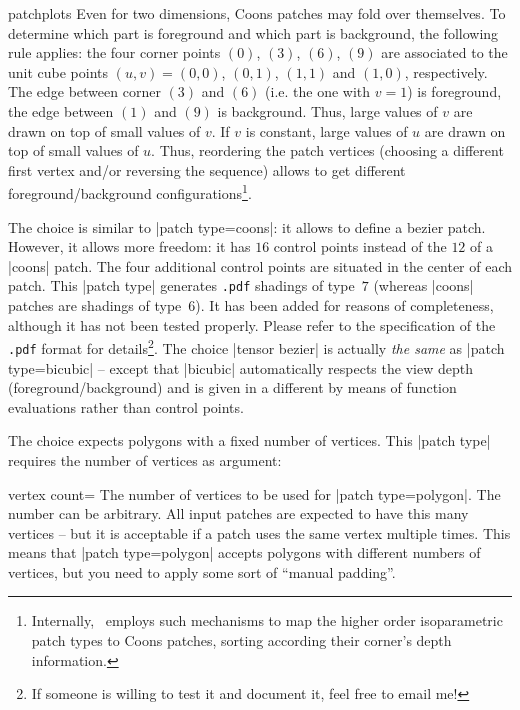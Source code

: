{\begin{pgfplotslibrary}{patchplots}
	Even for two dimensions, Coons patches may fold over themselves. To determine which part is foreground and which part is background, the following rule applies: the four corner points $(0)$, $(3)$, $(6)$, $(9)$ are associated to the unit cube points $(u,v) = (0,0)$, $(0,1)$, $(1,1)$ and $(1,0)$, respectively. The edge between corner $(3)$ and $(6)$ (i.e. the one with $v=1$) is foreground, the edge between $(1)$ and $(9)$ is background. Thus, large values of $v$ are drawn on top of small values of $v$. If $v$ is constant, large values of $u$ are drawn on top of small values of $u$. Thus, reordering the patch vertices (choosing a different first vertex and/or reversing the sequence) allows to get different foreground/background configurations\footnote{Internally, \PGFPlots\ employs such mechanisms to map the higher order isoparametric patch types to Coons patches, sorting according their corner's depth information.}.

	The choice  is similar to |patch type=coons|: it allows to define a bezier patch. However, it allows more freedom: it has $16$ control points instead of the $12$ of a |coons| patch. The four additional control points are situated in the center of each patch. This |patch type| generates \texttt{.pdf} shadings of type~$7$ (whereas |coons| patches are shadings of type~$6$). It has been added for reasons of completeness, although it has not been tested properly. Please refer to the specification of the \texttt{.pdf} format for details\footnote{If someone is willing to test it and document it, feel free to email me!}. The choice |tensor bezier| is actually \emph{the same} as |patch type=bicubic| -- except that |bicubic| automatically respects the view depth (foreground/background) and is given in a different by means of function evaluations rather than control points.
	

	The choice  expects polygons with a fixed number of vertices. This |patch type| requires the number of vertices as argument:
	\begin{pgfplotskey}{vertex count=}
		The number of vertices to be used for |patch type=polygon|. The number can be arbitrary. All input patches are expected to have this many vertices -- but it is acceptable if a patch uses the same vertex multiple times. This means that |patch type=polygon| accepts polygons with different numbers of vertices, but you need to apply some sort of ``manual padding''.
		

\end{pgfplotskey}
\end{pgfplotslibrary}}
